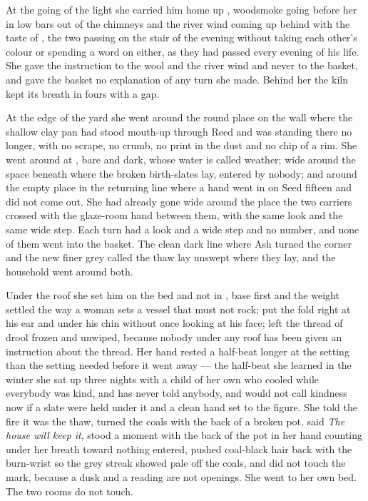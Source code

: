 \scenebreak

At the going of the light she carried him home up , woodsmoke going before her in low bars out of the chimneys and the river wind coming up behind with the taste of , the two passing on the stair of the evening without taking each other's colour or spending a word on either, as they had passed every evening of his life. She gave the instruction to the wool and the river wind and never to the basket, and gave the basket no explanation of any turn she made. Behind her the kiln kept its breath in fours with a gap.

At the edge of the yard she went around the round place on the wall where the shallow clay pan had stood mouth-up through Reed and was standing there no longer, with no scrape, no crumb, no print in the dust and no chip of a rim. She went around  at , bare and dark, whose water is called weather; wide around the space beneath  where the broken birth-slates lay, entered by nobody; and around the empty place in the returning line where a hand went in on Seed fifteen and did not come out. She had already gone wide around the place the two carriers crossed with the glaze-room hand between them, with the same look and the same wide step. Each turn had a look and a wide step and no number, and none of them went into the basket. The clean dark line where Ash turned the corner and the new finer grey called the thaw lay unswept where they lay, and the household went around both.

Under the roof she set him on the bed and not in , base first and the weight settled the way a woman sets a vessel that must not rock; put the fold right at his ear and under his chin without once looking at his face; left the thread of drool frozen and unwiped, because nobody under any roof has been given an instruction about the thread. Her hand rested a half-beat longer at the setting than the setting needed before it went away --- the half-beat she learned in the winter she sat up three nights with a child of her own who cooled while everybody was kind, and has never told anybody, and would not call kindness now if a slate were held under it and a clean hand set to the figure. She told the fire it was the thaw, turned the coals with the back of a broken pot, said \emph{The house will keep it}, stood a moment with the back of the pot in her hand counting under her breath toward nothing entered, pushed coal-black hair back with the burn-wrist so the grey streak showed pale off the coals, and did not touch the mark, because a dusk and a reading are not openings. She went to her own bed. The two rooms do not touch.

